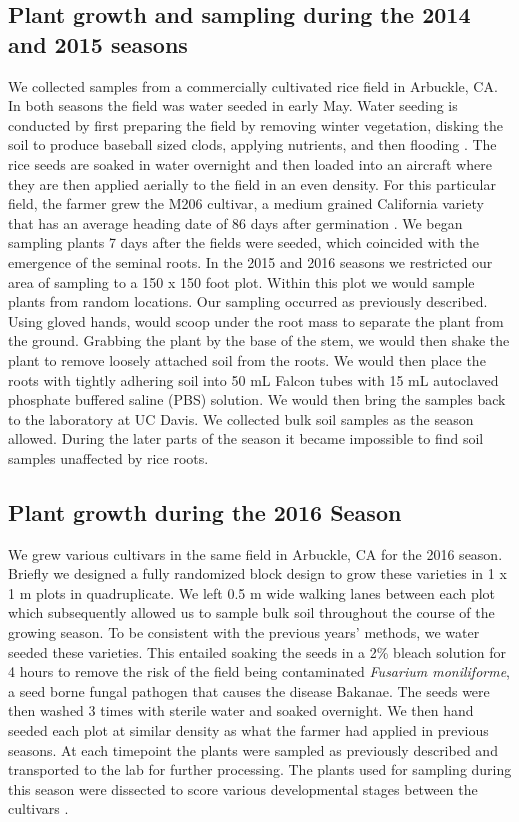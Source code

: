 \subsection{Plant growth and sampling during the 2014 and 2015 seasons}
%
We collected samples from a commercially cultivated rice field in Arbuckle, CA. In both seasons the field was water seeded in early May. Water seeding is conducted by first preparing the field by removing winter vegetation, disking the soil to produce baseball sized clods, applying nutrients, and then flooding \cite{Hardke}. The rice seeds are soaked in water overnight and then loaded into an aircraft where they are then applied aerially to the field in an even density. For this particular field, the farmer grew the M206 cultivar, a medium grained California variety that has an average heading date of 86 days after germination \cite{Linquist2012}. We began sampling plants 7 days after the fields were seeded, which coincided with the emergence of the seminal roots. In the 2015 and 2016 seasons we restricted our area of sampling to a 150 x 150 foot plot. Within this plot we would sample plants from random locations. Our sampling occurred as previously described. Using gloved hands, would scoop under the root mass to separate the plant from the ground. Grabbing the plant by the base of the stem, we would then shake the plant to remove loosely attached soil from the roots. We would then place the roots with tightly adhering soil into 50 mL Falcon tubes with 15 mL autoclaved phosphate buffered saline (PBS) solution. We would then bring the samples back to the laboratory at UC Davis. We collected bulk soil samples as the season allowed. During the later parts of the season it became impossible to find soil samples unaffected by rice roots.

\subsection{Plant growth during the 2016 Season}%
We grew various cultivars in the same field in Arbuckle, CA for the 2016 season. Briefly we designed a fully randomized block design to grow these varieties in 1 x 1 m plots in quadruplicate. We left 0.5 m wide walking lanes between each plot which subsequently allowed us to sample bulk soil throughout the course of the growing season. To be consistent with the previous years' methods, we water seeded these varieties. This entailed soaking the seeds in a 2\% bleach solution for 4 hours to remove the risk of the field being contaminated \textit{Fusarium moniliforme}, a seed borne fungal pathogen that causes the disease Bakanae. The seeds were then washed 3 times with sterile water and soaked overnight. We then hand seeded each plot at similar density as what the farmer had applied in previous seasons. At each timepoint the plants were sampled as previously described and transported to the lab for further processing. The plants used for sampling during this season were dissected to score various developmental stages between the cultivars \cite{Moldenhauer}.

